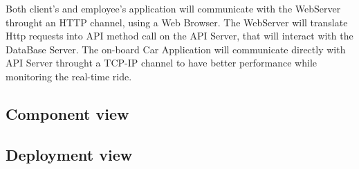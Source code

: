 \documentclass{article}
\begin{document}
Both client's and employee's application will communicate with the WebServer throught an HTTP channel, using a Web Browser.
The WebServer will translate Http requests into API method call on the API Server, that will interact with the DataBase Server.
The on-board Car Application will communicate directly with API Server throught a TCP-IP channel to have better performance
while monitoring the real-time ride.
\newpage
\subsection{Component view}

\begin{figure}[ht]
\end{figure} 
\newpage
\begin{figure}[ht]
\end{figure}

 

 \newpage
\subsection{Deployment view}
\begin{figure}[ht]
\end{figure}
\newpage
\end{document}
